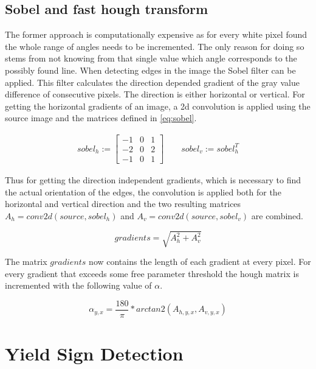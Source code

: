 \documentclass{report}
\begin{document}
\subsection{Sobel and fast hough transform}
\label{sec:fast_hough}

The former approach is computationally expensive as for every white
pixel found the whole range of angles needs to be incremented. The
only reason for doing so stems from not knowing from that single value
which angle corresponds to the possibly found line. When detecting
edges in the image the Sobel filter can be applied. This filter
calculates the direction depended gradient of the gray value
difference of consecutive pixels. The direction is either horizontal
or vertical. For getting the horizontal gradients of an image, a 2d
convolution is applied using the source image and the matrices defined
in \ref{eq:sobel}.

\begin{equation}\label{eq:sobel}
  \begin{split}
    sobel_h := \begin{bmatrix}
      -1 & 0 & 1 \\
      -2 & 0 & 2 \\
      -1 & 0 & 1
    \end{bmatrix}
    \qquad
    sobel_v := sobel_h^T
    \end{split}
\end{equation}

Thus for getting the direction independent gradients, which is
necessary to find the actual orientation of the edges, the convolution
is applied both for the horizontal and vertical direction and the two
resulting matrices \( A_h = conv2d(source, sobel_h) \) and \( A_v =
conv2d(source, sobel_v) \) are combined.

\begin{equation}
  gradients = \sqrt{A_h^2 + A_v^2}
\end{equation}

The matrix \( gradients \) now contains the length of each gradient at
every pixel. For every gradient that exceeds some free parameter
threshold the hough matrix is incremented with the following value of
\( \alpha \).

\begin{equation}
  \alpha_{y, x} = \frac{180}{\pi} * arctan2(A_{h,y,x}, A_{v,y,x})
\end{equation}

\section{Yield Sign Detection}
\label{sec:pipeline_yielddet}
\end{document}
